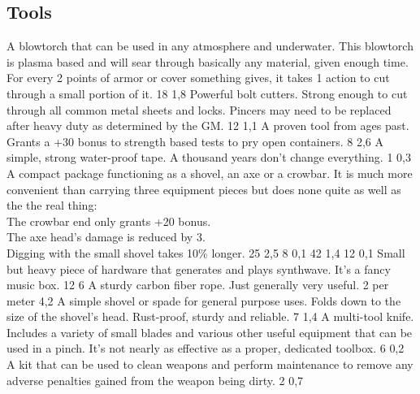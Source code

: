 \subsection{Tools}
\vspace{10mm}
\begin{multicols}{2}
    {A blowtorch that can be used in any atmosphere and underwater.
        This blowtorch is plasma based
        and will sear through basically any material,
        given enough time.\\
        For every 2 points of armor or cover something gives, %
        it takes 1 action to cut through a small portion of it.}
    {18}
    {1,8}
    {Powerful bolt cutters.
        Strong enough to cut through all common metal sheets and locks.
        Pincers may need to be replaced after heavy duty as determined by the GM.}
    {12}
    {1,1}
    {A proven tool from ages past.
        Grants a +30 bonus to strength based tests to pry open containers.}
    {8}
    {2,6}
    {A simple, strong water-proof tape.
        A thousand years don't change everything.}
    {1}
    {0,3}
    {A compact package functioning as
        a shovel,
        an axe
        or a crowbar.
        It is much more convenient than carrying three equipment pieces
        but does none quite as well as the the real thing:\\
	The crowbar end only grants +20 bonus.\\
	The axe head's damage is reduced by 3.\\
	Digging with the small shovel takes 10\% longer.}
    {25}
    {2,5}
    {8}
    {0,1}
    {42}
    {1,4}
    {12}
    {0,1}
    {Small but heavy piece of hardware that generates and plays synthwave.
        It’s a fancy music box.}
    {12}
    {6}
    {A sturdy carbon fiber rope. Just generally very useful.}
    {2 per meter}
    {4,2}
    {A simple shovel or spade for general purpose uses.
        Folds down to the size of the shovel’s head.
        Rust-proof, sturdy and reliable.}
    {7}
    {1,4}
    {A multi-tool knife.
        Includes a variety of small blades and various other useful equipment
        that can be used in a pinch.
        It's not nearly as effective as a proper, dedicated toolbox.}
    {6}
    {0,2}
    {A kit that can be used to clean weapons and perform maintenance
        to remove any adverse penalties gained from the weapon being dirty.}
    {2}
    {0,7}
\end{multicols}

